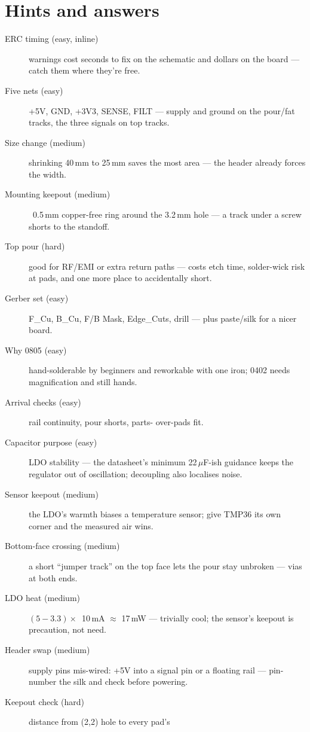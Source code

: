 \section*{Hints and answers}
\begin{description}
\item[ERC timing (easy, inline)] warnings cost seconds to fix on the
schematic and dollars on the board --- catch them where they're
free.
\item[Five nets (easy)] +5V, GND, +3V3, SENSE, FILT --- supply and
ground on the pour/fat tracks, the three signals on top tracks.
\item[Size change (medium)] shrinking 40\,mm to 25\,mm saves the
most area --- the header already forces the width.
\item[Mounting keepout (medium)] ~0.5\,mm copper-free ring around
the 3.2\,mm hole --- a track under a screw shorts to the standoff.
\item[Top pour (hard)] good for RF/EMI or extra return paths ---
costs etch time, solder-wick risk at pads, and one more place to
accidentally short.
\item[Gerber set (easy)] F\_Cu, B\_Cu, F/B Mask, Edge\_Cuts, drill
--- plus paste/silk for a nicer board.
\item[Why 0805 (easy)] hand-solderable by beginners and reworkable
with one iron; 0402 needs magnification and still hands.
\item[Arrival checks (easy)] rail continuity, pour shorts, parts-
over-pads fit.
\item[Capacitor purpose (easy)] LDO stability --- the datasheet's
minimum 22\,$\mu$F-ish guidance keeps the regulator out of
oscillation; decoupling also localises noise.
\item[Sensor keepout (medium)] the LDO's warmth biases a temperature
sensor; give TMP36 its own corner and the measured air wins.
\item[Bottom-face crossing (medium)] a short ``jumper track'' on the
top face lets the pour stay unbroken --- vias at both ends.
\item[LDO heat (medium)] $(5-3.3)\times$~10\,mA $\approx$ 17\,mW
--- trivially cool; the sensor's keepout is precaution, not need.
\item[Header swap (medium)] supply pins mis-wired: +5V into a
signal pin or a floating rail --- pin-number the silk and check
before powering.
\item[Keepout check (hard)] distance from (2,2) hole to every pad's

\end{description}
